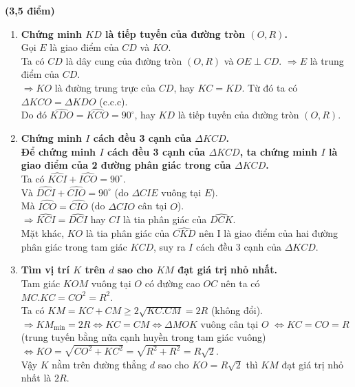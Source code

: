 \begin{ex}{\bf (3,5 điểm)}
{\begin{enumerate}
{}
\item {\bf Chứng minh $KD$ là tiếp tuyến của đường tròn $(O,R)$.}\\
Gọi $E$ là giao điểm của $CD$ và $KO$.\\
Ta có $CD$ là dây cung của đường tròn $(O,R)$ và $OE \perp CD$.
$\Rightarrow E$ là trung điểm của $CD$.\\
$\Rightarrow KO$ là đường trung trực của $CD$, hay $KC=KD$. Từ đó ta có $\Delta KCO=\Delta KDO$ (c.c.c).\\
Do đó $\widehat{KDO}=\widehat{KCO}=90^\circ$, hay $KD$ là tiếp tuyến của đường tròn $(O,R)$.
\item {\bf Chứng minh $I$ cách đều 3 cạnh của $\Delta KCD$.}\\
{\bf Để chứng minh $I$ cách đều 3 cạnh của $\Delta KCD$, ta chứng minh $I$ là giao điểm của 2 đường phân giác trong của $\Delta KCD$.}\\
Ta có $\widehat{KCI}+\widehat{ICO}=90^\circ$.\\ 
 Và $\widehat{DCI}+\widehat{CIO}=90^\circ$ (do $\Delta CIE$ vuông tại $E$).\\
 Mà $\widehat{ICO}=\widehat{CIO}$ (do $\Delta CIO$ cân tại $O$).\\
 $\Rightarrow \widehat{KCI}=\widehat{DCI}$ hay $CI$ là tia phân giác của $\widehat{DCK}$.\\
 Mặt khác, $KO$ là tia phân giác của $\widehat{CKD}$ nên I là giao điểm của hai đường phân giác trong tam giác $KCD$, suy ra $I$ cách đều 3 cạnh của $\Delta KCD$.
\item {\bf Tìm vị trí $K$ trên $d$ sao cho $KM$ đạt giá trị nhỏ nhất.}\\
 Tam giác $KOM$ vuông tại $O$ có đường cao $OC$ nên ta có $MC.KC=CO^2=R^2$.\\
 Ta có $KM=KC+CM \geq 2\sqrt{KC.CM}=2R$ (không đổi).\\
 $\Rightarrow KM_{\min}=2R \Leftrightarrow KC=CM \Leftrightarrow \Delta MOK$ vuông cân tại $O$ $\Leftrightarrow KC=CO=R$ (trung tuyến bằng nửa cạnh huyền trong tam giác vuông) $\Leftrightarrow KO=\sqrt{CO^2+KC^2}=\sqrt{R^2+R^2}=R\sqrt{2}$.\\
 Vậy $K$ nằm trên đường thẳng $d$ sao cho $KO=R\sqrt{2}$ thì $KM$ đạt giá trị nhỏ nhất là $2R$.
\end{enumerate}
}
\end{ex}
